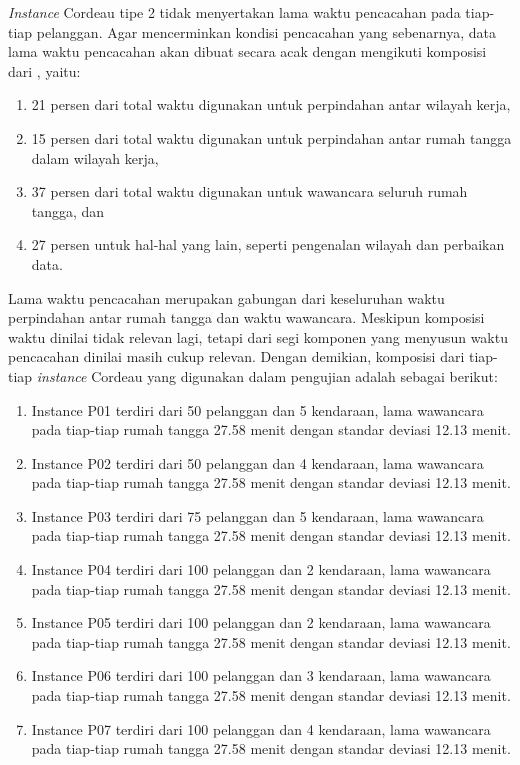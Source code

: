 \textit{Instance} Cordeau tipe 2 tidak menyertakan lama waktu pencacahan pada tiap-tiap pelanggan. Agar mencerminkan kondisi pencacahan yang sebenarnya, data lama waktu pencacahan akan dibuat secara acak dengan mengikuti komposisi dari \citep{sudman_time_1965}, yaitu:
\begin{enumerate}
	\item 21 persen dari total waktu digunakan untuk perpindahan antar wilayah kerja, 
	\item 15 persen dari total waktu digunakan untuk perpindahan antar rumah tangga dalam wilayah kerja, 
	\item 37 persen dari total waktu digunakan untuk wawancara seluruh rumah tangga, dan 
	\item 27 persen untuk hal-hal yang lain, seperti pengenalan wilayah dan perbaikan data.
\end{enumerate}
Lama waktu pencacahan merupakan gabungan dari keseluruhan waktu perpindahan antar rumah tangga dan waktu wawancara. Meskipun komposisi waktu \citep{sudman_time_1965} dinilai tidak relevan lagi, tetapi dari segi komponen yang menyusun waktu pencacahan dinilai masih cukup relevan. Dengan demikian, komposisi dari tiap-tiap \textit{instance} Cordeau yang digunakan dalam pengujian adalah sebagai berikut:
\begin{enumerate}
	\item Instance P01 terdiri dari 50 pelanggan dan 5 kendaraan, lama wawancara pada tiap-tiap rumah tangga 27.58 menit dengan standar deviasi 12.13 menit.
	\item Instance P02 terdiri dari 50 pelanggan dan 4 kendaraan, lama wawancara pada tiap-tiap rumah tangga 27.58 menit dengan standar deviasi 12.13 menit.
	\item Instance P03 terdiri dari 75 pelanggan dan 5 kendaraan, lama wawancara pada tiap-tiap rumah tangga 27.58 menit dengan standar deviasi 12.13 menit.
	\item Instance P04 terdiri dari 100 pelanggan dan 2 kendaraan, lama wawancara pada tiap-tiap rumah tangga 27.58 menit dengan standar deviasi 12.13 menit.
	\item Instance P05 terdiri dari 100 pelanggan dan 2 kendaraan, lama wawancara pada tiap-tiap rumah tangga 27.58 menit dengan standar deviasi 12.13 menit.
	\item Instance P06 terdiri dari 100 pelanggan dan 3 kendaraan, lama wawancara pada tiap-tiap rumah tangga 27.58 menit dengan standar deviasi 12.13 menit.
	\item Instance P07 terdiri dari 100 pelanggan dan 4 kendaraan, lama wawancara pada tiap-tiap rumah tangga 27.58 menit dengan standar deviasi 12.13 menit.
\end{enumerate}


